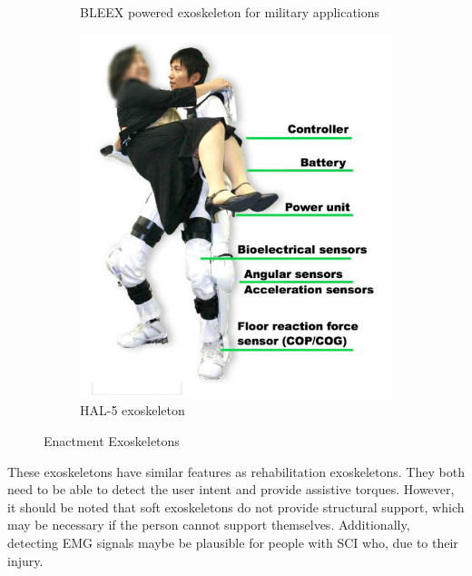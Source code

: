 \begin{figure}
\begin{subfigure}{0.3\textwidth}
    \caption[BLEEX]{BLEEX powered exoskeleton for military applications \cite{kazerooni2006hybrid}}
    \label{fig:BLEEX}
     \end{subfigure}
     \begin{subfigure}{\textwidth}
           \centering
            \includegraphics[width=.45\linewidth]{images/background/HAL-5.png}
        \caption[HAL-5]{HAL-5 exoskeleton \cite{sankai2010hal}}
    \label{fig:HAL5}
     \end{subfigure}
        \caption{Enactment Exoskeletons}
        \label{fig:enhanceExos}
\end{figure}

These exoskeletons have similar features as rehabilitation exoskeletons. They both need to be able to detect the user intent and provide assistive torques. However, it should be noted that soft exoskeletons do not provide structural support, which may be necessary if the person cannot support themselves. Additionally, detecting EMG signals maybe be plausible for people with SCI who, due to their injury.